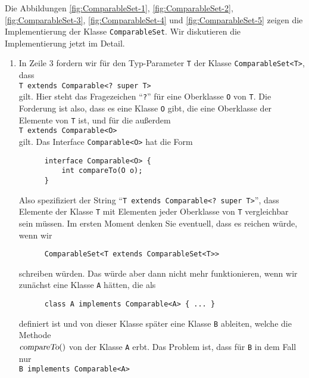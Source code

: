 Die Abbildungen 
\ref{fig:ComparableSet-1}, \ref{fig:ComparableSet-2}, \ref{fig:ComparableSet-3},
\ref{fig:ComparableSet-4} und \ref{fig:ComparableSet-5}
zeigen die Implementierung der Klasse \texttt{ComparableSet}.  Wir diskutieren die
Implementierung jetzt im Detail.
\begin{enumerate}
\item In Zeile 3 fordern wir f\"ur den Typ-Parameter \texttt{T} der Klasse
      \texttt{ComparableSet<T>}, dass
      \\[0.2cm]
      \hspace*{1.3cm}
      \texttt{T extends Comparable<? super T>}
      \\[0.2cm]
      gilt.  Hier steht das Fragezeichen ``\texttt{?}'' f\"ur eine Oberklasse \texttt{O}
      von \texttt{T}.  Die Forderung ist also, dass es eine Klasse \texttt{O} gibt, die
      eine Oberklasse der Elemente von \texttt{T} ist, und f\"ur die au{\ss}erdem
      \\[0.2cm]
      \hspace*{1.3cm}
      \texttt{T extends Comparable<O>}
      \\[0.2cm]
      gilt.  Das Interface \texttt{Comparable<O>} hat die Form
      \begin{verbatim}
      interface Comparable<O> {
          int compareTo(O o);
      }
      \end{verbatim}
      Also spezifiziert der String ``\texttt{T extends Comparable<? super T>}'', dass
      Elemente der Klasse \texttt{T} mit Elementen jeder Oberklasse von \texttt{T}
      vergleichbar sein m\"ussen.  Im ersten Moment denken Sie eventuell, dass es reichen
      w\"urde, wenn wir 
\begin{verbatim}
      ComparableSet<T extends ComparableSet<T>>
\end{verbatim}
      schreiben w\"urden.  Das w\"urde aber dann nicht mehr funktionieren, wenn wir zun\"achst
      eine Klasse \texttt{A} h\"atten, die als
\begin{verbatim}
      class A implements Comparable<A> { ... }
\end{verbatim}
      definiert ist und von dieser Klasse sp\"ater eine Klasse \texttt{B} ableiten, welche die
      Methode\\
      $\textsl{compareTo}()$ von der Klasse \texttt{A} erbt.  Das Problem ist,
      dass f\"ur \texttt{B} in dem Fall nur
      \\[0.2cm]
      \hspace*{1.3cm}
      \texttt{B implements Comparable<A>}

\end{enumerate}
